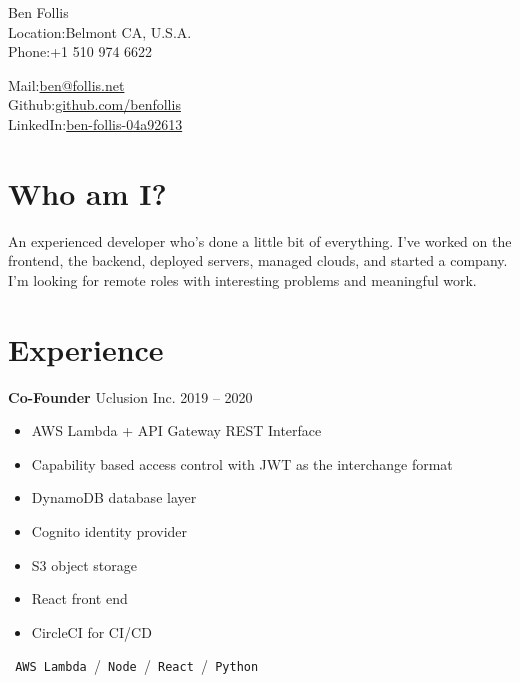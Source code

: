 \documentclass{res}
\begin{document}


{\huge Ben Follis}\\

Location:{Belmont CA, U.S.A.}\\
Phone:{+1 510 974 6622}\\
\vspace{-\baselineskip} %

Mail:{\href{mailto:ben@follis.net}{ben@follis.net}}\\
Github:{\href{https://github.com/benfollis}{github.com/benfollis}}\\
LinkedIn:{\href{https://www.linkedin.com/in/ben-follis-04a92613}{ben-follis-04a92613}}\\



\section{Who am I?}
An experienced developer who's done a little bit of everything.
I've worked on the frontend, the backend, deployed servers, managed clouds, and started a company.
I'm looking for remote roles with interesting problems and meaningful work.


\section{Experience}
        {\bf Co-Founder} \hfill Uclusion Inc. \hfill 2019 -- 2020
        \begin{itemize}
        \item AWS Lambda + API Gateway REST Interface
        \item Capability based access control with JWT as the interchange format
        \item DynamoDB database layer
        \item Cognito identity provider
        \item S3 object storage
        \item React front end
        \item CircleCI for CI/CD
        \end{itemize}
        \texttt{ AWS Lambda }\slash\texttt{ Node }\slash\texttt{ React }\slash\texttt{ Python }\\
        
\end{document}
